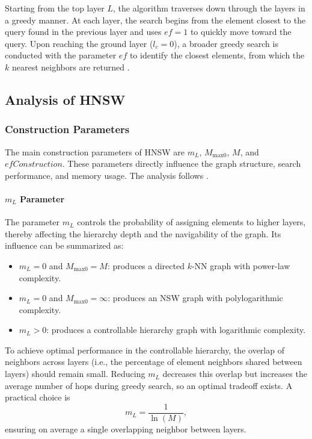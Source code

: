 Starting from the top layer $L$, the algorithm traverses down through the layers in a greedy manner. At each layer, the search begins from the element closest to the query found in the previous layer and uses $ef = 1$ to quickly move toward the query. Upon reaching the ground layer ($l_c = 0$), a broader greedy search is conducted with the parameter $ef$ to identify the closest elements, from which the $k$ nearest neighbors are returned \cite{Malkov-Yashunin-2016}.



\subsection{Analysis of HNSW}

\subsubsection{Construction Parameters}

The main construction parameters of HNSW are $m_L$, $M_{\text{max0}}$, $M$, and $efConstruction$. These parameters directly influence the graph structure, search performance, and memory usage. The analysis follows \cite{Malkov-Yashunin-2016}.

\paragraph{$m_L$ Parameter}

The parameter $m_L$ controls the probability of assigning elements to higher layers, thereby affecting the hierarchy depth and the navigability of the graph. Its influence can be summarized as: 

\begin{itemize}
    \item $m_L = 0$ and $M_{\text{max0}} = M$: produces a directed $k$-NN graph with power-law complexity.
    \item $m_L = 0$ and $M_{\text{max0}} = \infty$: produces an NSW graph with polylogarithmic complexity.
    \item $m_L > 0$: produces a controllable hierarchy graph with logarithmic complexity.
\end{itemize}

To achieve optimal performance in the controllable hierarchy, the overlap of neighbors across layers (i.e., the percentage of element neighbors shared between layers) should remain small. Reducing $m_L$ decreases this overlap but increases the average number of hops during greedy search, so an optimal tradeoff exists. A practical choice is
\[
m_L = \frac{1}{\ln(M)},
\]
ensuring on average a single overlapping neighbor between layers.

